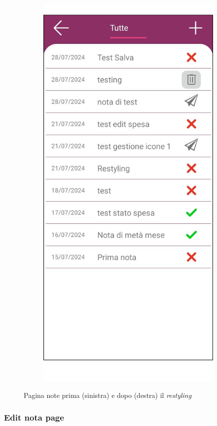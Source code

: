 \begin{figure}[H]
\begin{subfigure}{.5\textwidth}
        \includegraphics[width=.7\columnwidth]{images/screenshot/new/allNote.png}\vspace{2mm}
    \end{subfigure}
    \caption{Pagina note prima (sinistra) e dopo (destra) il \emph{restyling}}
\end{figure}


\subsubsection{Edit nota page}

